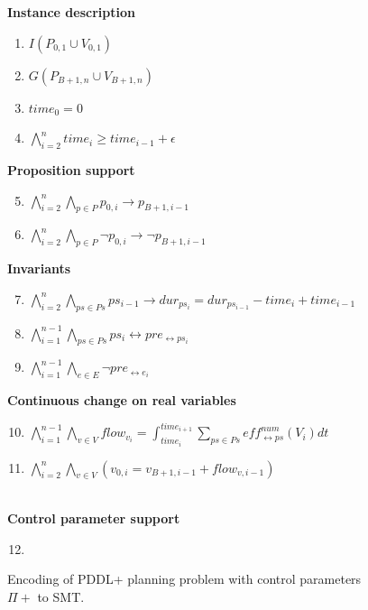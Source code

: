\begin{figure}[thb!]
\begin{minipage}[t]{0.39\linewidth}
\textbf{Instance description}
\begin{enumerate}[label=P\arabic*.]
  \item $I(P_{0,1}\cup V_{0,1})$
  \item $G(P_{B+1,n}\cup V_{B+1,n})$
  \item $time_0 = 0$
  \item $\bigwedge_{i=2}^n time_i \geq time_{i-1}+\epsilon$
\end{enumerate}
\textbf{Proposition support}
\begin{enumerate}[label=P\arabic*.]\setcounter{enumi}{4}
  \item $\bigwedge_{i=2}^n \bigwedge_{p\in P} p_{0,i} \rightarrow p_{B+1,i-1}$
  \item $\bigwedge_{i=2}^n \bigwedge_{p\in P} \neg p_{0,i} \rightarrow \neg p_{B+1,i-1}$
\end{enumerate}
\end{minipage}
\begin{minipage}[t]{0.6\linewidth}
\textbf{Invariants}
\begin{enumerate}[label=P\arabic*.]\setcounter{enumi}{6}
  \item $\bigwedge_{i=2}^n \bigwedge_{ps\in Ps} ps_{i-1} \rightarrow dur_{ps_i} = dur_{ps_{i-1}} - time_i + time_{i-1}$
  \item $\bigwedge_{i=1}^{n-1} \bigwedge_{ps \in Ps}  ps_i \leftrightarrow pre_{\leftrightarrow ps_i}$
  \item $\bigwedge_{i=1}^{n-1} \bigwedge_{e\in E} \neg pre_{\leftrightarrow e_i}$
\end{enumerate}
\textbf{Continuous change on real variables}
\begin{enumerate}[label=P\arabic*.]\setcounter{enumi}{9}
  \item $\bigwedge_{i=1}^{n-1} \bigwedge_{v\in V} flow_{v_i} = \int^{time_{i+1}}_{time_i} \sum_{ps\in Ps} eff^{num}_{\leftrightarrow ps}(V_i)dt$
  \item $\bigwedge_{i=2}^n \bigwedge_{v\in V} (v_{0,i} = v_{B+1,i-1} + flow_{v,i-1})$
\end{enumerate}
\end{minipage}
\vspace{1em}\\\textbf{Control parameter support}
\begin{enumerate}[label=P\arabic*.]\setcounter{enumi}{11}
 \item {}
\end{enumerate}
\caption{Encoding of PDDL+ planning problem with control parameters $\Pi+$ to SMT.}
\label{eq:plan2}
\end{figure}

